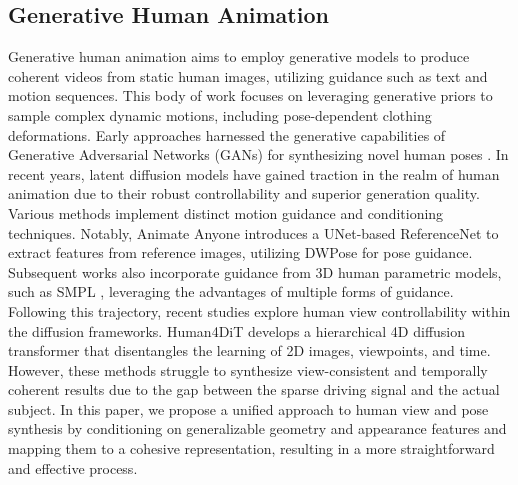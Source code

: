 \subsection{Generative Human Animation}
Generative human animation aims to employ generative models to produce coherent videos from static human images, utilizing guidance such as text and motion sequences. This body of work focuses on leveraging generative priors to sample complex dynamic motions, including pose-dependent clothing deformations. Early approaches harnessed the generative capabilities of Generative Adversarial Networks (GANs) \cite{goodfellow2014generative} for synthesizing novel human poses \cite{wang2021one, chan2019dance, liu2019neural}. In recent years, latent diffusion models \cite{rombach2022high} have gained traction in the realm of human animation due to their robust controllability and superior generation quality. Various methods \cite{wang2024disco, chang2023magicpose, hu2023animateanyone, zhu2024champ, li2024dispose, sun2024drive, chang2025x, li2024synthesizing} implement distinct motion guidance and conditioning techniques. Notably, Animate Anyone \cite{hu2023animateanyone} introduces a UNet-based ReferenceNet to extract features from reference images, utilizing DWPose \cite{yang2023effective} for pose guidance. Subsequent works \cite{zhu2024champ} also incorporate guidance from 3D human parametric models, such as SMPL \cite{loper2015smpl, zhao2024metric,zhao2024synergistic}, leveraging the advantages of multiple forms of guidance. Following this trajectory, recent studies \cite{he2024magicman, shao2024human4dit, qiu2024anigs, liu2024human} explore human view controllability within the diffusion frameworks. Human4DiT \cite{shao2024human4dit} develops a hierarchical 4D diffusion transformer that disentangles the learning of 2D images, viewpoints, and time. 
%
%
However, these methods struggle to synthesize view-consistent and temporally coherent results due to the gap between the sparse driving signal and the actual subject.
In this paper, we propose a unified approach to human view and pose synthesis by conditioning on generalizable geometry and appearance features and mapping them to a cohesive representation, resulting in a more straightforward and effective process.

